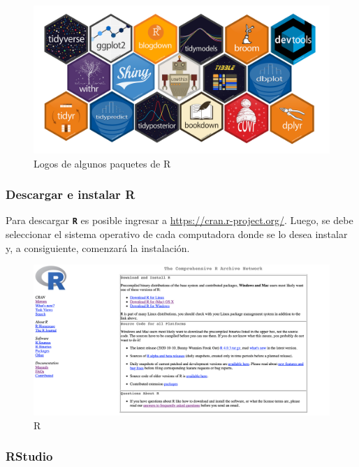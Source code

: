 \documentclass[
]{article}
\begin{document}
\begin{figure}

{\centering \includegraphics[width=0.6\linewidth]{imagenes/R_packages} 

}

\caption{Logos de algunos paquetes de R}\label{fig:unnamed-chunk-135}
\end{figure}

\hypertarget{descargar-e-instalar-r}{%
\subsubsection{Descargar e instalar R}\label{descargar-e-instalar-r}}

Para descargar \textbf{\texttt{R}} es posible ingresar a \url{https://cran.r-project.org/}. Luego, se debe seleccionar el sistema operativo de cada computadora donde se lo desea instalar y, a consiguiente, comenzará la instalación.

\begin{figure}

{\centering \includegraphics[width=0.8\linewidth]{imagenes/R_desc} 

}

\caption{R}\label{fig:unnamed-chunk-136}
\end{figure}

\hypertarget{rstudio}{%
\subsubsection{RStudio}\label{rstudio}}
\end{document}
